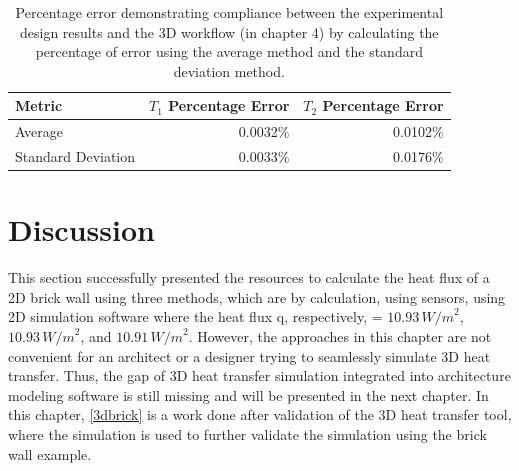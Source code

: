 \begin{table}[htb]
\caption[2D Results Percentage error]{Percentage error demonstrating compliance between the experimental design results and the 3D workflow (in chapter 4) by calculating the percentage of error using the average method and the standard deviation method.}
    \label{error2d}
     \centering
 \begin{tabular}{lrr}
        \toprule
        Metric & $T_1$ Percentage Error & $T_2$ Percentage Error \\
        \midrule
        Average & 0.0032\% & 0.0102\% \\
        Standard Deviation & 0.0033\% & 0.0176\% \\
        \bottomrule
    \end{tabular}
\end{table}






\section{Discussion}
This section successfully presented the resources to calculate the heat flux of a 2D brick wall using three methods, which are by calculation, using sensors, using 2D simulation software where the heat flux q, respectively, = \( 10.93 \, {W/m}^2 \), \( 10.93 \, {W/m}^2 \), and \( 10.91 \, {W/m}^2 \). However, the approaches in this chapter are not convenient for an architect or a designer trying to seamlessly simulate 3D heat transfer. Thus, the gap of 3D heat transfer simulation integrated into architecture modeling software is still missing and will be presented in the next chapter. In this chapter, \ref{3dbrick} is a work done after validation of the 3D heat transfer tool, where the simulation is used to further validate the simulation using the brick wall example.